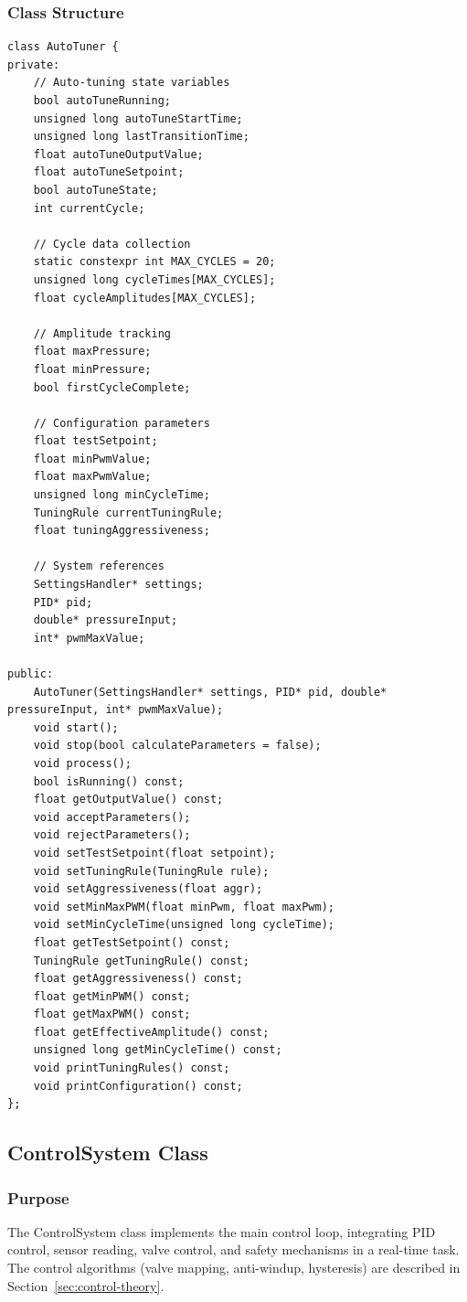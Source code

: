 \subsubsection{Class Structure}
\begin{lstlisting}[caption=AutoTuner Class Key Members - Actual Implementation]
class AutoTuner {
private:
    // Auto-tuning state variables
    bool autoTuneRunning;
    unsigned long autoTuneStartTime;
    unsigned long lastTransitionTime;
    float autoTuneOutputValue;
    float autoTuneSetpoint;
    bool autoTuneState;
    int currentCycle;
    
    // Cycle data collection
    static constexpr int MAX_CYCLES = 20;
    unsigned long cycleTimes[MAX_CYCLES];
    float cycleAmplitudes[MAX_CYCLES];
    
    // Amplitude tracking
    float maxPressure;
    float minPressure;
    bool firstCycleComplete;
    
    // Configuration parameters
    float testSetpoint;
    float minPwmValue;
    float maxPwmValue;
    unsigned long minCycleTime;
    TuningRule currentTuningRule;
    float tuningAggressiveness;
    
    // System references
    SettingsHandler* settings;
    PID* pid;
    double* pressureInput;
    int* pwmMaxValue;
    
public:
    AutoTuner(SettingsHandler* settings, PID* pid, double* pressureInput, int* pwmMaxValue);
    void start();
    void stop(bool calculateParameters = false);
    void process();
    bool isRunning() const;
    float getOutputValue() const;
    void acceptParameters();
    void rejectParameters();
    void setTestSetpoint(float setpoint);
    void setTuningRule(TuningRule rule);
    void setAggressiveness(float aggr);
    void setMinMaxPWM(float minPwm, float maxPwm);
    void setMinCycleTime(unsigned long cycleTime);
    float getTestSetpoint() const;
    TuningRule getTuningRule() const;
    float getAggressiveness() const;
    float getMinPWM() const;
    float getMaxPWM() const;
    float getEffectiveAmplitude() const;
    unsigned long getMinCycleTime() const;
    void printTuningRules() const;
    void printConfiguration() const;
};
\end{lstlisting}

\subsection{ControlSystem Class}

\subsubsection{Purpose}
The ControlSystem class implements the main control loop, integrating PID control, sensor reading, valve control, and safety mechanisms in a real-time task. The control algorithms (valve mapping, anti-windup, hysteresis) are described in Section~\ref{sec:control-theory}.

